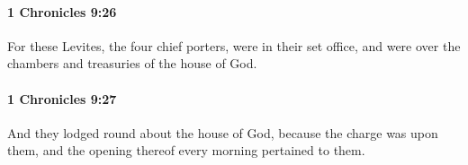 		\paragraph{1 Chronicles 9:26} %
			\label{1CHRONICLES-9-26}

			For these Levites, the four chief porters, were in their set office, and were over the chambers and treasuries of the house of God.


		\paragraph{1 Chronicles 9:27} %
			\label{1CHRONICLES-9-27}

			And they lodged round about the house of God, because the charge was upon them, and the opening thereof every morning pertained to them.


